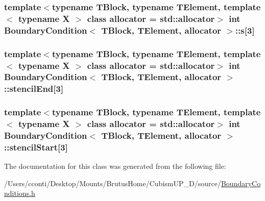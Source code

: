 \subsubsection[{s}]{\setlength{\rightskip}{0pt plus 5cm}template$<$typename T\+Block, typename T\+Element, template$<$ typename X $>$ class allocator = std\+::allocator$>$ int {\bf Boundary\+Condition}$<$ T\+Block, T\+Element, allocator $>$\+::s\mbox{[}3\mbox{]}\hspace{0.3cm}{\ttfamily [protected]}}\label{class_boundary_condition_a7734cfc6ee1ce3a1dea426ab289a299a}
\hypertarget{class_boundary_condition_af396b479ba0487ba5c0e45d5b636f09e}{}
\subsubsection[{stencil\+End}]{\setlength{\rightskip}{0pt plus 5cm}template$<$typename T\+Block, typename T\+Element, template$<$ typename X $>$ class allocator = std\+::allocator$>$ int {\bf Boundary\+Condition}$<$ T\+Block, T\+Element, allocator $>$\+::stencil\+End\mbox{[}3\mbox{]}\hspace{0.3cm}{\ttfamily [protected]}}\label{class_boundary_condition_af396b479ba0487ba5c0e45d5b636f09e}
\hypertarget{class_boundary_condition_aed1e3cfd20d69c6084d901c246698fdd}{}
\subsubsection[{stencil\+Start}]{\setlength{\rightskip}{0pt plus 5cm}template$<$typename T\+Block, typename T\+Element, template$<$ typename X $>$ class allocator = std\+::allocator$>$ int {\bf Boundary\+Condition}$<$ T\+Block, T\+Element, allocator $>$\+::stencil\+Start\mbox{[}3\mbox{]}\hspace{0.3cm}{\ttfamily [protected]}}\label{class_boundary_condition_aed1e3cfd20d69c6084d901c246698fdd}


The documentation for this class was generated from the following file\+:\begin{DoxyCompactItemize}
\item 
/\+Users/cconti/\+Desktop/\+Mounts/\+Brutus\+Home/\+Cubism\+U\+P\+\_\+D/source/\hyperlink{_boundary_conditions_8h}{Boundary\+Conditions.\+h}\end{DoxyCompactItemize}
